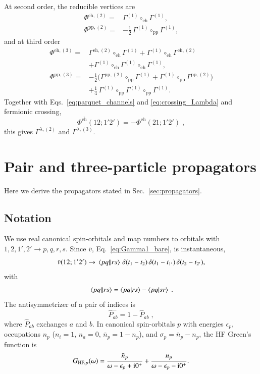 \documentclass[aip,jcp,reprint,noshowkeys,superscriptaddress]{revtex4-1}
\newcommand{\eps}{\epsilon}
\newcommand{\ii}{\mathrm{i}}
\newcommand{\eh}{\text{eh}}
\newcommand{\teh}{\overline{\text{eh}}}
\newcommand{\pp}{\text{pp}}
\begin{document}
At second order, the reducible vertices are
\begin{equation}
	\begin{aligned}
\Phi^{\eh,(2)}
={}&
\Gamma^{(1)}\circ_{\eh}\Gamma^{(1)}, \\
\Phi^{\pp,(2)}
={}&
-\frac12\,\Gamma^{(1)}\circ_{\pp}\Gamma^{(1)},
\label{eq:Phi2_explicit}
	\end{aligned}
\end{equation}
and at third order 
\begin{equation}
	\begin{aligned}
\Phi^{\eh,(3)}
={}&
\Gamma^{\eh,(2)}\circ_{\eh}\Gamma^{(1)}
+\Gamma^{(1)}\circ_{\eh}\Gamma^{\eh,(2)}
\\
&+\Gamma^{(1)}\circ_{\eh}\Gamma^{(1)}\circ_{\eh}\Gamma^{(1)},
\\
\Phi^{\pp,(3)}
={}&
-\frac12\big(\Gamma^{\pp,(2)}\circ_{\pp}\Gamma^{(1)}
+\Gamma^{(1)}\circ_{\pp}\Gamma^{\pp,(2)}\big)
\\
&+\frac14\,\Gamma^{(1)}\circ_{\pp}\Gamma^{(1)}\circ_{\pp}\Gamma^{(1)}.
\label{eq:Phi3_st}
\end{aligned} 
\end{equation}
Together with Eqs.~\eqref{eq:parquet_channels} and
\eqref{eq:crossing_Lambda} and fermionic crossing,
\begin{equation}
\Phi^{\teh}(12;1'2')
=
-\Phi^{\eh}(21;1'2') \;,
\label{eq:crossing}
\end{equation}
this gives $\Gamma^{\lambda,(2)}$ and $\Gamma^{\lambda,(3)}$.

\section{Pair and three-particle propagators}
\label{app:propagators}
Here we derive the propagators stated in Sec.~\ref{sec:propagators}.

\subsection{Notation}
We use real canonical spin-orbitals and map numbers to orbitals
with $1,2,1',2'\to p,q,r,s$.
Since $\bar v$, Eq.~\eqref{eq:Gamma1_bare}, is instantaneous,
\begin{equation}
\bar v(12;1'2')
\to
\mel{pq}{}{rs}\,
\delta(t_1-t_2)\,\delta(t_1-t_{1'})\,\delta(t_2-t_{2'}),
\label{eq:vbar_orbital}
\end{equation}
with
\begin{equation}
\mel{pq}{}{rs} =
\braket{pq}{rs}-\braket{pq}{sr} \;.
\label{eq:mel_def}
\end{equation}
The antisymmetrizer of a pair of indices is
\begin{equation}
\hat P^-_{ab}=1-\hat P_{ab} \;,
\label{eq:Pminus}
\end{equation}
where $\hat P_{ab}$ exchanges $a$ and $b$.
In canonical spin-orbitals $p$ with energies $\eps_p$, occupations
$n_p$ ($n_i=1$, $n_a=0$, $\bar n_p=1-n_p$), and
$\sigma_p=\bar n_p-n_p$, the HF Green's function is
\begin{equation}
	\label{eq:GHF_omega}
G_{{\rm HF},p}(\omega)
=
\frac{\bar n_p}{\omega-\eps_p+\ii0^+}
+
\frac{n_p}{\omega-\eps_p-\ii0^+}.
\end{equation}
\end{document}
